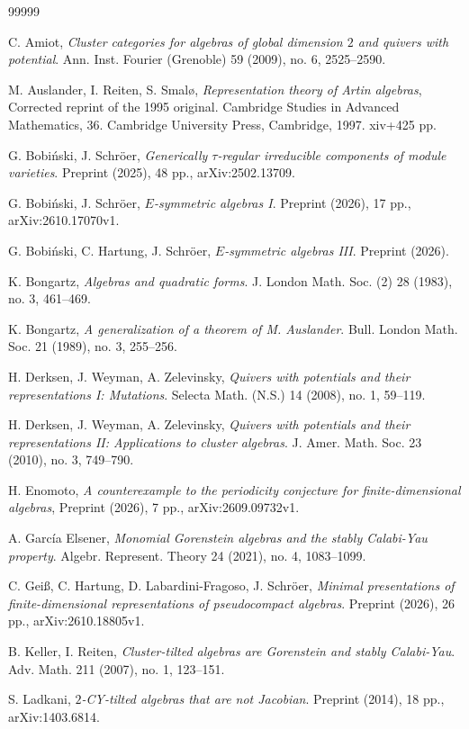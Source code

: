 \documentclass[12pt,reqno]{amsart}
\theoremstyle{definition}
\begin{document}

\begin{thebibliography}{99999}


%
C. Amiot, \emph{Cluster categories for algebras of global dimension 
$2$ and quivers with potential}. 
Ann. Inst. Fourier (Grenoble) 59 (2009), no. 6, 2525--2590.

%
M. Auslander, I. Reiten, S. Smal\o,
\emph{Representation theory of Artin algebras},
Corrected reprint of the 1995 original. Cambridge Studies in Advanced Mathematics, 36. Cambridge University Press, Cambridge, 1997.
xiv+425 pp.

%
G. Bobi\'nski, J. Schr\"oer,
\emph{Generically $\tau$-regular irreducible components of module
varieties}.
Preprint (2025), 48 pp., arXiv:2502.13709.

%
G. Bobi\'nski, J. Schr\"oer,
\emph{$E$-symmetric algebras I}.
Preprint (2026), 17 pp., arXiv:2610.17070v1.

%
G. Bobi\'nski, C. Hartung, J. Schr\"oer,
\emph{$E$-symmetric algebras III}.
Preprint (2026).

%
K. Bongartz, \emph{Algebras and quadratic forms}. 
J. London Math. Soc. (2) 28 (1983), no. 3, 461--469.

%
K. Bongartz, \emph{A generalization of a theorem of M. Auslander}.
Bull. London Math. Soc. 21 (1989), no. 3, 255--256.

%
H. Derksen, J. Weyman, A. Zelevinsky,
\emph{Quivers with potentials and their representations I:
Mutations}.
Selecta Math. (N.S.) 14 (2008), no. 1, 59--119.

%
H. Derksen, J. Weyman, A. Zelevinsky,
\emph{Quivers with potentials and their representations II:
Applications to cluster algebras}.
J. Amer. Math. Soc. 23 (2010), no. 3, 749--790.

%
H. Enomoto, \emph{A counterexample to the periodicity conjecture for finite-dimensional algebras}, 
Preprint (2026), 7 pp., arXiv:2609.09732v1.

%
A. Garc{\'i}a Elsener, \emph{Monomial Gorenstein algebras and the stably Calabi-Yau property}.
Algebr. Represent. Theory 24 (2021), no. 4, 1083--1099.

%
C. Gei{\ss}, C. Hartung, D. Labardini-Fragoso, J. Schr\"oer,
\emph{Minimal presentations of finite-dimensional representations
of pseudocompact algebras}.
Preprint (2026), 26 pp., arXiv:2610.18805v1.

%
B. Keller, I. Reiten, 
\emph{Cluster-tilted algebras are Gorenstein and stably Calabi-Yau}.
 Adv. Math. 211 (2007), no. 1, 123--151.

%
S. Ladkani,
\emph{$2$-CY-tilted algebras that are not Jacobian}.
Preprint (2014), 18 pp., arXiv:1403.6814.

\end{thebibliography}
\end{document}
